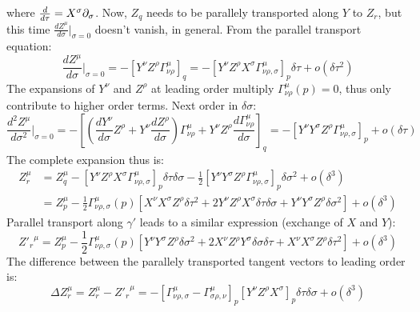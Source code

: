 where $ \frac{d}{d\tau} = X^\sigma \partial_\sigma $. Now, $ Z_q $ needs to be parallely transported along $ Y $ to $ Z_r $, but this time $ \frac{dZ^\mu}{d\sigma}\big\vert_{\sigma = 0} $ doesn't vanish, in general. From the parallel transport equation:
\begin{equation*}
  \frac{dZ^\mu}{d\sigma}\bigg\vert_{\sigma = 0} = - \left[ Y^\nu Z^\rho \Gamma^\mu_{\nu \rho} \right]_q = - \left[ Y^\nu Z^\rho X^\sigma \Gamma^\mu_{\nu \rho , \sigma} \right]_p \delta \tau + o(\delta\tau^2)
\end{equation*}
The expansions of $ Y^\nu $ and $ Z^\rho $ at leading order multiply $ \Gamma^\mu_{\nu \rho}(p) = 0 $, thus only contribute to higher order terms. Next order in $ \delta \sigma $:
\begin{equation*}
  \frac{d^2 Z^\mu}{d\sigma^2}\bigg\vert_{\sigma = 0} = - \left[ \left( \frac{dY^\nu}{d\sigma} Z^\rho + Y^\nu \frac{dZ^\rho}{d\sigma} \right) \Gamma^\mu_{\nu \rho} + Y^\nu Z^\rho \frac{d\Gamma^\mu_{\nu \rho}}{d\sigma} \right]_q = - \left[ Y^\nu Y^\sigma Z^\rho \Gamma^\mu_{\nu \rho , \sigma} \right]_p + o(\delta\tau)
\end{equation*}
The complete expansion thus is:
\begin{equation*}
  \begin{split}
    Z_r^\mu
    &= Z_q^\mu - \left[ Y^\nu Z^\rho X^\sigma \Gamma^\mu_{\nu \rho , \sigma} \right]_p \delta\tau \delta\sigma - \frac{1}{2} \left[ Y^\nu Y^\sigma Z^\rho \Gamma^\mu_{\nu \rho , \sigma} \right]_p \delta\sigma^2 + o(\delta^3) \\
    &= Z_p^\mu - \frac{1}{2} \Gamma^\mu_{\nu \rho , \sigma}(p) \left[ X^\nu X^\sigma Z^\rho \delta\tau^2 + 2 Y^\nu Z^\rho X^\sigma \delta\tau \delta\sigma + Y^\nu Y^\sigma Z^\rho \delta\sigma^2 \right] + o(\delta^3)
  \end{split}
\end{equation*}
Parallel transport along $ \gamma' $ leads to a similar expression (exchange of $ X $ and $ Y $):
\begin{equation*}
  {Z'_r}^\mu = Z_p^\mu - \frac{1}{2} \Gamma^\mu_{\nu \rho , \sigma}(p) \left[ Y^\nu Y^\sigma Z^\rho \delta\sigma^2 + 2 X^\nu Z^\rho Y^\sigma \delta\sigma \delta\tau + X^\nu X^\sigma Z^\rho \delta\tau^2 \right] + o(\delta^3)
\end{equation*}
The difference between the parallely transported tangent vectors to leading order is:
\begin{equation*}
  \Delta Z_r^\mu = Z_r^\mu - {Z'_r}^\mu = - \left[ \Gamma^\mu_{\nu \rho , \sigma} - \Gamma^\mu_{\sigma \rho , \nu} \right]_p \left[ Y^\nu Z^\rho X^\sigma \right]_p \delta\tau \delta\sigma + o(\delta^3)
\end{equation*}
